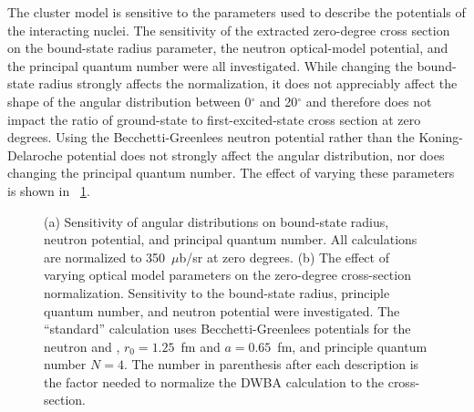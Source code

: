 The cluster model is sensitive to the parameters used to describe the potentials of the interacting nuclei.  The sensitivity of the extracted zero-degree cross section on the bound-state radius parameter, the neutron optical-model potential, and the principal quantum number were all investigated.  While changing the bound-state radius strongly affects the normalization, it does not appreciably affect the shape of the angular distribution between 0$^{\circ}$ and 20$^{\circ}$ and therefore does not impact the ratio of ground-state to first-excited-state cross section at zero degrees.  Using the Becchetti-Greenlees neutron potential rather than the Koning-Delaroche potential does not strongly affect the angular distribution, nor does changing the principal quantum number.  The effect of varying these parameters is shown in {\fig}~\ref{fig:varyParam}.
\begin{figure}[!htbp]
\centering
{}
\caption[Sensitivity of angular distributions and zero-degree cross sections to bound-state and neutron optical model parameters.]{(a) Sensitivity of angular distributions on bound-state radius, neutron potential, and principal quantum number.  All calculations are normalized to 350~$\mu$b/sr at zero degrees. (b) The effect of varying optical model parameters on the zero-degree cross-section normalization.  Sensitivity to the bound-state radius, principle quantum number, and neutron potential were investigated.  The ``standard'' calculation uses Becchetti-Greenlees potentials for the neutron and , $r_0=1.25$~fm and $a=0.65$~fm, and principle quantum number $N=4$.  The number in parenthesis after each description is the factor needed to normalize the DWBA calculation to the  cross-section.}
\label{fig:varyParam}
\end{figure}
